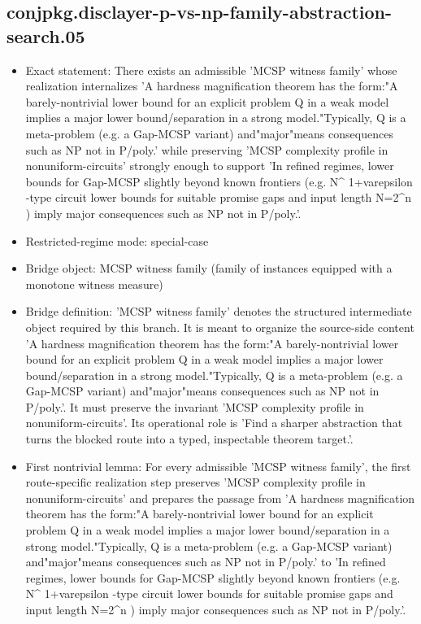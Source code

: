 \documentclass[11pt]{article}
\begin{document}
\subsection*{conjpkg.disclayer-p-vs-np-family-abstraction-search.05}
\begin{itemize}
\item Exact statement: There exists an admissible 'MCSP witness family' whose realization internalizes 'A hardness magnification theorem has the form:"A barely-nontrivial lower bound for an explicit problem Q in a weak model implies a major lower bound/separation in a strong model."Typically, Q is a meta-problem (e.g. a Gap-MCSP variant) and"major"means consequences such as NP not in P/poly.' while preserving 'MCSP complexity profile in nonuniform-circuits' strongly enough to support 'In refined regimes, lower bounds for Gap-MCSP slightly beyond known frontiers (e.g. N\textasciicircum{} 1+varepsilon -type circuit lower bounds for suitable promise gaps and input length N=2\textasciicircum{}n ) imply major consequences such as NP not in P/poly.'.
\item Restricted-regime mode: special-case
\item Bridge object: MCSP witness family (family of instances equipped with a monotone witness measure)
\item Bridge definition: 'MCSP witness family' denotes the structured intermediate object required by this branch. It is meant to organize the source-side content 'A hardness magnification theorem has the form:"A barely-nontrivial lower bound for an explicit problem Q in a weak model implies a major lower bound/separation in a strong model."Typically, Q is a meta-problem (e.g. a Gap-MCSP variant) and"major"means consequences such as NP not in P/poly.'. It must preserve the invariant 'MCSP complexity profile in nonuniform-circuits'. Its operational role is 'Find a sharper abstraction that turns the blocked route into a typed, inspectable theorem target.'.
\item First nontrivial lemma: For every admissible 'MCSP witness family', the first route-specific realization step preserves 'MCSP complexity profile in nonuniform-circuits' and prepares the passage from 'A hardness magnification theorem has the form:"A barely-nontrivial lower bound for an explicit problem Q in a weak model implies a major lower bound/separation in a strong model."Typically, Q is a meta-problem (e.g. a Gap-MCSP variant) and"major"means consequences such as NP not in P/poly.' to 'In refined regimes, lower bounds for Gap-MCSP slightly beyond known frontiers (e.g. N\textasciicircum{} 1+varepsilon -type circuit lower bounds for suitable promise gaps and input length N=2\textasciicircum{}n ) imply major consequences such as NP not in P/poly.'.

\end{itemize}
\end{document}
